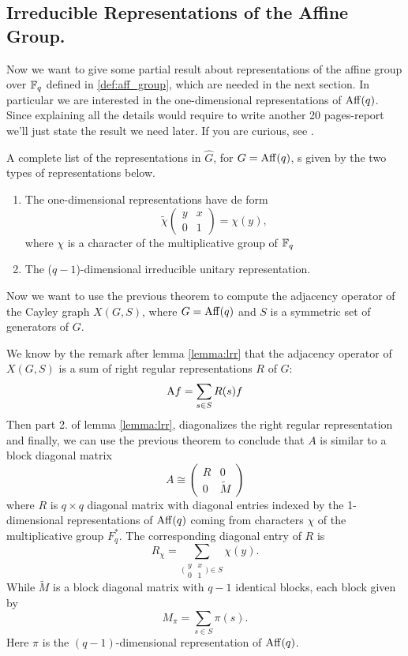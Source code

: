 \subsection{ Irreducible Representations of the Affine Group.}
Now we want to give some partial result about representations of the affine group over ${\mathbb F}_q$ defined in \eqref{def:aff_group}, which are needed in the next section. In particular we are interested in the one-dimensional representations of $\operatorname{Aff}(q)$. Since explaining all the details would require to write another 20 pages-report we'll just state the result we need later. If you are curious, see \cite[Chapters~16-17]{terras_1999}.
\begin{theorem}
A complete  list  of  the representations  in $\hat{G}$, for $G=\operatorname{Aff}(q)$, s  given  by the two types  of representations  below.
\begin{enumerate}
\item The one-dimensional representations have de form
\[
\widetilde{\chi}
\begin{pmatrix}
y &x\\
0 &1
\end{pmatrix}
=\chi(y),
\]
where $\chi$ is a character of the multiplicative group of ${\mathbb F}_q$
\item The ($q-1$)-dimensional  irreducible unitary representation.
\end{enumerate}

\end{theorem}
Now we want to use the previous theorem to compute the adjacency operator of  the Cayley graph $X(G,S)$, where $G=\operatorname{Aff}(q)$ and $S$ is a symmetric set of generators of $G$.

We know by the remark after lemma \ref{lemma:lrr} that the  adjacency operator of $X(G,S)$ is a sum  of right regular representations $R$ of $G$:
\[
\operatorname{A\!} f = \sum_{s\in S}R(s)f 
\]
Then part 2. of lemma \ref{lemma:lrr}, diagonalizes the right regular representation and finally, we can use the previous theorem to conclude that $A$ is similar to a block diagonal matrix
\[
A\cong \begin{pmatrix}
R &0 \\
0 &\widetilde{M}
\end{pmatrix}
\] 
where $R$ is $q\times q$ diagonal matrix with diagonal entries indexed  by  the  1-dimensional representations  of $\operatorname{Aff}(q)$ coming  from  characters $\chi$  of the multiplicative group $F_q^{*}$. The corresponding  diagonal entry  of $R$ is 
\[
R_\chi=\sum_{\bigl(\begin{smallmatrix}
y &x\\
0 &1
\end{smallmatrix}\bigr) \in S }\chi(y).
\]
While $\widetilde{M}$   is a block diagonal matrix with $q-1$ identical blocks, each block given by
\[
M_\pi=\sum_{s\in S}\pi(s).
\]
Here $\pi$ is the $(q-1)$-dimensional representation of $\operatorname{Aff}(q)$.